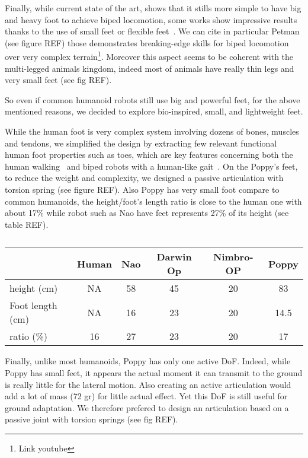 Finally, while current state of the art, shows that it stills more simple to have big and heavy foot to achieve biped locomotion, some works show impressive results thanks to the use of small feet or flexible feet~\parencite{bruneau2001dynamic}. We can cite in particular Petman (see figure REF) those demonstrates breaking-edge skills for biped locomotion over very complex terrain\footnote{Link youtube}.
Moreover this aspect seems to be coherent with the multi-legged animals kingdom, indeed most of animals have really thin legs and very small feet (see fig REF).

So even if common humanoid robots still use big and powerful feet, for the above mentioned reasons, we decided to explore bio-inspired, small, and lightweight feet.

While the human foot is very complex system involving dozens of bones, muscles and tendons, we simplified the design by extracting few relevant functional human foot properties such as toes, which are key features concerning both the human walking~\cite{Hughes1990} and biped robots with a human-like gait~\cite{Sellaouti2006}. On the Poppy's feet, to reduce the weight and complexity, we designed a passive articulation with torsion spring (see figure REF).
Also Poppy has very small foot compare to common humanoids, the height/foot's length ratio is close to the human one with about 17\% while robot such as Nao have feet represents 27\% of its height (see table REF).

\begin{table}[ht]
\centering
\begin{tabular}{l| c c c c c}
    & Human & Nao & Darwin Op & Nimbro-OP & Poppy \\
    \hline
    height (cm) & NA & 58 & 45 & 20 & 83\\
    Foot length (cm) & NA & 16 & 23 & 20 & 14.5\\
    ratio (\%) & 16 & 27 & 23 & 20 & 17\\
\end{tabular}
\caption{}
\label{tab:poppy_feet_compare}
\end{table}

Finally, unlike most humanoids, Poppy has only one active DoF. Indeed, while Poppy has small feet, it appears the actual moment it can transmit to the ground is really little for the lateral motion. Also creating an active articulation would add a lot of mass (72 gr) for little actual effect. Yet this DoF is still useful for ground adaptation. We therefore prefered to design an articulation based on a passive joint with torsion springs (see fig REF).


